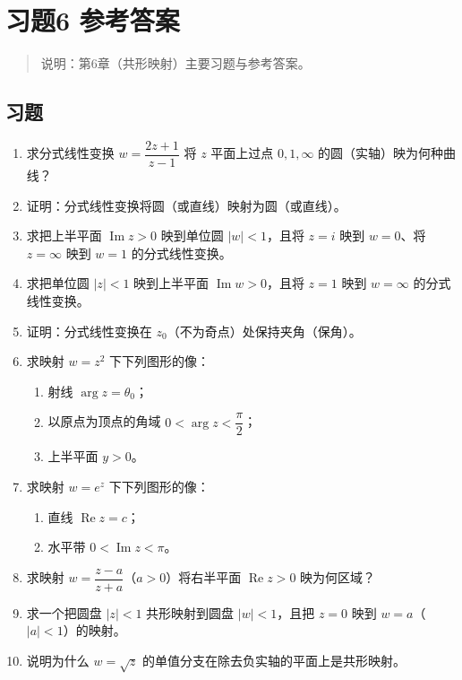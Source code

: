 \chapter{习题6 参考答案}\label{ux4e60ux98986-ux53c2ux8003ux7b54ux6848}

\begin{quote}
说明：第6章（共形映射）主要习题与参考答案。
\end{quote}

\section{习题}\label{ux4e60ux9898-5}

\begin{enumerate}
\def\labelenumi{\arabic{enumi}.}
\item
  求分式线性变换 \(w=\dfrac{2z+1}{z-1}\) 将 \(z\) 平面上过点
  \(0,1,\infty\) 的圆（实轴）映为何种曲线？
\item
  证明：分式线性变换将圆（或直线）映射为圆（或直线）。
\item
  求把上半平面 \(\operatorname{Im}z>0\) 映到单位圆 \(|w|<1\)，且将
  \(z=i\) 映到 \(w=0\)、将 \(z=\infty\) 映到 \(w=1\) 的分式线性变换。
\item
  求把单位圆 \(|z|<1\) 映到上半平面 \(\operatorname{Im}w>0\)，且将
  \(z=1\) 映到 \(w=\infty\) 的分式线性变换。
\item
  证明：分式线性变换在 \(z_0\)（不为奇点）处保持夹角（保角）。
\item
  求映射 \(w=z^2\) 下下列图形的像：

  \begin{enumerate}
  \def\labelenumii{(\arabic{enumii})}
  \tightlist
  \item
    射线 \(\arg z=\theta_0\)；
  \item
    以原点为顶点的角域 \(0<\arg z<\dfrac{\pi}{2}\)；
  \item
    上半平面 \(y>0\)。
  \end{enumerate}
\item
  求映射 \(w=e^z\) 下下列图形的像：

  \begin{enumerate}
  \def\labelenumii{(\arabic{enumii})}
  \tightlist
  \item
    直线 \(\operatorname{Re}z=c\)；
  \item
    水平带 \(0<\operatorname{Im}z<\pi\)。
  \end{enumerate}
\item
  求映射 \(w=\dfrac{z-a}{z+a}\)（\(a>0\)）将右半平面
  \(\operatorname{Re}z>0\) 映为何区域？
\item
  求一个把圆盘 \(|z|<1\) 共形映射到圆盘 \(|w|<1\)，且把 \(z=0\) 映到
  \(w=a\)（\(|a|<1\)）的映射。
\item
  说明为什么 \(w=\sqrt z\) 的单值分支在除去负实轴的平面上是共形映射。
\end{enumerate}

